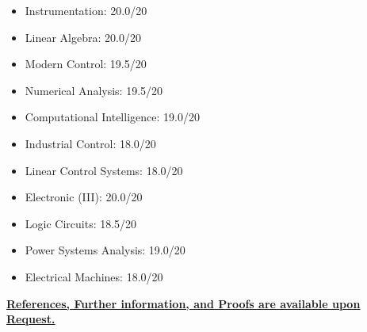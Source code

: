 \documentclass[11pt,a4paper,sans]{moderncv} %
\begin{document}
\begin{cvcolumns}
    {
        \begin{itemize}
            \item \href{https://aut.ac.ir/en}{} Instrumentation: 20.0/20
            \item \href{https://aut.ac.ir/en}{} Linear Algebra: 20.0/20
            \item \href{https://aut.ac.ir/en}{} Modern Control: 19.5/20
            \item \href{https://aut.ac.ir/en}{} Numerical Analysis: 19.5/20
            \item \href{https://aut.ac.ir/en}{} Computational Intelligence: 19.0/20
            \item \href{https://aut.ac.ir/en}{} Industrial Control: 18.0/20
            \item \href{https://aut.ac.ir/en}{} Linear Control Systems: 18.0/20
            \item \href{https://aut.ac.ir/en}{} Electronic (III): 20.0/20
            \item \href{https://aut.ac.ir/en}{} Logic Circuits: 18.5/20
            \item \href{https://aut.ac.ir/en}{} Power Systems Analysis: 19.0/20
            \item \href{https://aut.ac.ir/en}{} Electrical Machines: 18.0/20   
        \end{itemize}
    }
\end{cvcolumns}

	\vspace{2em}
	\centerline{\underline{\textbf{	\faExclamationCircle \hspace{0.5 pt}  \href{mailto:mjahmadee@gmail.com}{References, Further information, and Proofs are available upon Request.} }}}
\end{document}
